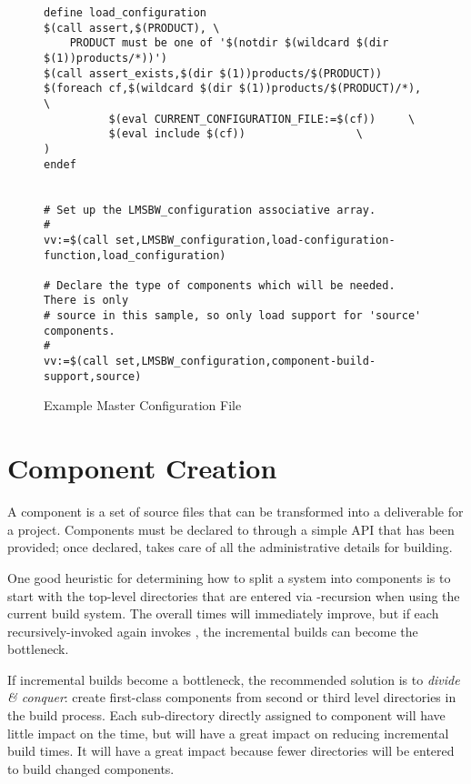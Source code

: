 \begin{landscape}
\begin{figure}
\hrulefill
\begin{verbatim}
define load_configuration
$(call assert,$(PRODUCT), \
    PRODUCT must be one of '$(notdir $(wildcard $(dir $(1))products/*))')
$(call assert_exists,$(dir $(1))products/$(PRODUCT))
$(foreach cf,$(wildcard $(dir $(1))products/$(PRODUCT)/*),	\
          $(eval CURRENT_CONFIGURATION_FILE:=$(cf))		\
          $(eval include $(cf))					\
)
endef


# Set up the LMSBW_configuration associative array.
#
vv:=$(call set,LMSBW_configuration,load-configuration-function,load_configuration)

# Declare the type of components which will be needed.  There is only
# source in this sample, so only load support for 'source' components.
#
vv:=$(call set,LMSBW_configuration,component-build-support,source)
\end{verbatim}
\hrulefill
\caption{Example Master Configuration File}\label{wrap:sample-master-config}
\end{figure}
\end{landscape}

\section{Component Creation}\label{wrap:component-creation}

A component is a set of source files that can be transformed into a
deliverable for a project.  Components must be declared to \lmsbw
through a simple API that has been provided; once declared, \lmsbw
takes care of all the administrative details for building.

One good heuristic for determining how to split a system into
components is to start with the top-level directories that are entered
via \make-recursion when using the current build system.  The overall
\nullbuild times will immediately improve, but if each
recursively-invoked \makefile again invokes \make, the incremental
builds can become the bottleneck.

If incremental builds become a bottleneck, the recommended solution is
to \emph{divide \& conquer}: create first-class components from second
or third level directories in the build process.  Each sub-directory
directly assigned to component will have little impact on the
\nullbuild time, but will have a great impact on reducing incremental
build times.  It will have a great impact because fewer directories
will be entered to build changed components.


